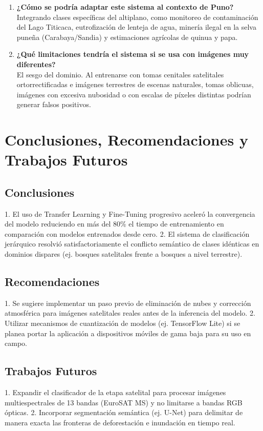 \documentclass[conference,onecolumn]{IEEEtran}
\begin{document}
\begin{enumerate}
    \item \textbf{¿Cómo se podría adaptar este sistema al contexto de Puno?}\\
    Integrando clases específicas del altiplano, como monitoreo de contaminación del Lago Titicaca, eutrofización de lenteja de agua, minería ilegal en la selva puneña (Carabaya/Sandia) y estimaciones agrícolas de quinua y papa.
    
    \item \textbf{¿Qué limitaciones tendría el sistema si se usa con imágenes muy diferentes?}\\
    El sesgo del dominio. Al entrenarse con tomas cenitales satelitales ortorrectificadas e imágenes terrestres de escenas naturales, tomas oblicuas, imágenes con excesiva nubosidad o con escalas de píxeles distintas podrían generar falsos positivos.
\end{enumerate}

\section{Conclusiones, Recomendaciones y Trabajos Futuros}

\subsection{Conclusiones}
1. El uso de Transfer Learning y Fine-Tuning progresivo aceleró la convergencia del modelo reduciendo en más del 80\% el tiempo de entrenamiento en comparación con modelos entrenados desde cero.
2. El sistema de clasificación jerárquico resolvió satisfactoriamente el conflicto semántico de clases idénticas en dominios dispares (ej. bosques satelitales frente a bosques a nivel terrestre).

\subsection{Recomendaciones}
1. Se sugiere implementar un paso previo de eliminación de nubes y corrección atmosférica para imágenes satelitales reales antes de la inferencia del modelo.
2. Utilizar mecanismos de cuantización de modelos (ej. TensorFlow Lite) si se planea portar la aplicación a dispositivos móviles de gama baja para su uso en campo.

\subsection{Trabajos Futuros}
1. Expandir el clasificador de la etapa satelital para procesar imágenes multiespectrales de 13 bandas (EuroSAT MS) y no limitarse a bandas RGB ópticas.
2. Incorporar segmentación semántica (ej. U-Net) para delimitar de manera exacta las fronteras de deforestación e inundación en tiempo real.
\end{document}
